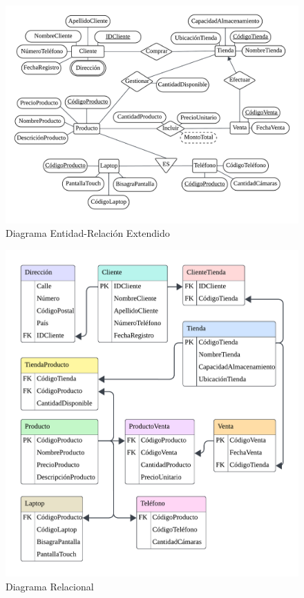 \begin{figure}[H]
  \centering
  \includegraphics[scale = 0.21]{Imagenes/diagramas/DERE.png}
  \caption{Diagrama Entidad-Relación Extendido}
\end{figure}

\begin{figure}[H]
  \centering
  \includegraphics[scale = 0.35]{Imagenes/diagramas/DR.png}
  \caption{Diagrama Relacional}
\end{figure}
